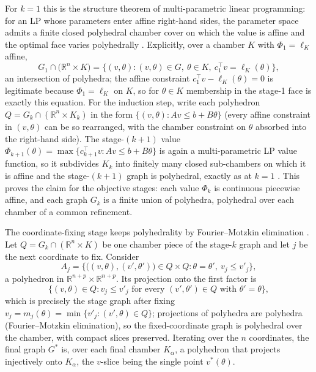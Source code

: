 \documentclass[11pt,a4paper]{article}
\theoremstyle{plain}
\theoremstyle{definition}
\theoremstyle{remark}
\newcommand{\RR}{\mathbb{R}}
\begin{document}
For $k = 1$ this is the structure theorem of multi-parametric
linear programming: for an LP whose parameters enter affine
right-hand sides, the parameter space admits a finite closed
polyhedral chamber cover on which the value is affine and the
optimal face varies polyhedrally \citep{borrelli2003}. Explicitly,
over a chamber $K$ with $\Phi_1 = \ell_K$ affine,
\[
G_1 \cap \bigl(\RR^{n} \times K\bigr)
= \bigl\{(v,\theta) : (v,\theta) \in G,\ \theta \in K,\
c_1^{\top}v = \ell_K(\theta)\bigr\},
\]
an intersection of polyhedra; the affine constraint
$c_1^{\top}v - \ell_K(\theta) = 0$ is legitimate because
$\Phi_1 = \ell_K$ on $K$, so for $\theta \in K$ membership in the
stage-1 face is exactly this equation. For the induction step,
write each polyhedron $Q = G_k \cap (\RR^{n} \times K_{k})$ in the
form $\{(v, \theta) : A v \le b + B\theta\}$ (every affine
constraint in $(v, \theta)$ can be so rearranged, with the chamber
constraint on $\theta$ absorbed into the right-hand side). The
stage-$(k{+}1)$ value $\Phi_{k+1}(\theta) = \max\{c_{k+1}^{\top}v :
Av \le b + B\theta\}$ is again a multi-parametric LP value function,
so it subdivides $K_{k}$ into finitely many closed sub-chambers on
which it is affine and the stage-$(k{+}1)$ graph is polyhedral,
exactly as at $k = 1$ \citep{borrelli2003}. This proves the claim
for the objective stages: each value $\Phi_k$ is continuous
piecewise affine, and each graph $G_k$ is a finite union of
polyhedra, polyhedral over each chamber of a common refinement.

The coordinate-fixing stage keeps polyhedrality by Fourier--Motzkin
elimination \citep{ziegler1995}. Let $Q = G_k \cap (\RR^{n} \times
K)$ be one chamber piece of the stage-$k$ graph and let $j$ be the
next coordinate to fix. Consider
\[
A_j = \bigl\{\bigl((v,\theta), (v',\theta')\bigr) \in Q \times Q :
\theta = \theta',\ v_j \le v'_j\bigr\},
\]
a polyhedron in $\RR^{n+p} \times \RR^{n+p}$. Its projection onto
the first factor is
\[
\bigl\{(v, \theta) \in Q : v_j \le v'_j \text{ for every }
(v', \theta') \in Q \text{ with } \theta' = \theta\bigr\},
\]
which is precisely the stage graph after fixing
$v_j = m_j(\theta) = \min\{v'_j : (v',\theta) \in Q\}$; projections
of polyhedra are polyhedra (Fourier--Motzkin elimination), so the
fixed-coordinate graph is polyhedral over the chamber, with compact
slices preserved. Iterating over the $n$ coordinates, the final
graph $G^{*}$ is, over each final chamber $K_{\alpha}$, a polyhedron
that projects injectively onto $K_{\alpha}$, the $v$-slice being the
single point $v^{*}(\theta)$.
\end{document}
